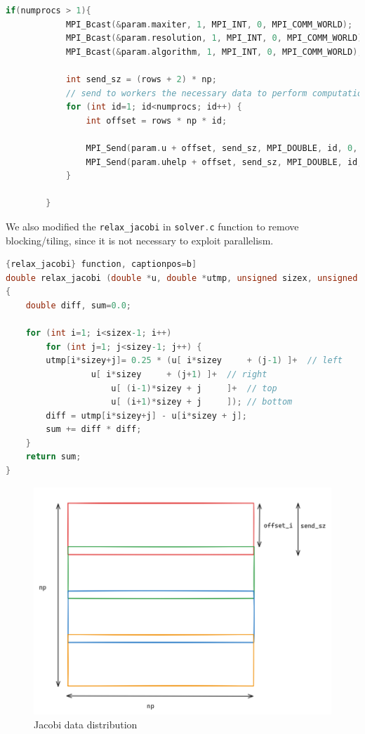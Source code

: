 \documentclass[titlepage]{article}
\newcommand{\incode}[1]{\lstinline[style=inlineC,language=C]{#1}}
\begin{document}
\begin{lstlisting}[style=c, language=C, caption=MPI data distribution, captionpos=b]
if(numprocs > 1){
            MPI_Bcast(&param.maxiter, 1, MPI_INT, 0, MPI_COMM_WORLD);
            MPI_Bcast(&param.resolution, 1, MPI_INT, 0, MPI_COMM_WORLD);
            MPI_Bcast(&param.algorithm, 1, MPI_INT, 0, MPI_COMM_WORLD);

            int send_sz = (rows + 2) * np;
            // send to workers the necessary data to perform computation
            for (int id=1; id<numprocs; id++) {
                int offset = rows * np * id;

                MPI_Send(param.u + offset, send_sz, MPI_DOUBLE, id, 0, MPI_COMM_WORLD);
                MPI_Send(param.uhelp + offset, send_sz, MPI_DOUBLE, id, 0, MPI_COMM_WORLD);
            }

        }
\end{lstlisting}

We also modified the \incode{relax_jacobi} in \incode{solver.c} function to remove blocking/tiling, since it is not necessary to exploit parallelism.

\begin{lstlisting}[style=c, language=C, caption=MPI \incode{relax_jacobi} function, captionpos=b]
double relax_jacobi (double *u, double *utmp, unsigned sizex, unsigned sizey)
{
    double diff, sum=0.0;
  
    for (int i=1; i<sizex-1; i++) 
        for (int j=1; j<sizey-1; j++) {
        utmp[i*sizey+j]= 0.25 * (u[ i*sizey     + (j-1) ]+  // left
                 u[ i*sizey     + (j+1) ]+  // right
                     u[ (i-1)*sizey + j     ]+  // top
                     u[ (i+1)*sizey + j     ]); // bottom
        diff = utmp[i*sizey+j] - u[i*sizey + j];
        sum += diff * diff; 
    }
    return sum;
}
\end{lstlisting}

\begin{figure}[H]
\centering
\includegraphics[width=1\textwidth]{mpi_jacobi_data_distribution.png}
\caption{Jacobi data distribution}
\label{fig:data_distribution}
\end{figure}
\end{document}

